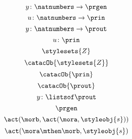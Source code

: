 {\begin{forslides}
\begin{equation}
        \end{equation}
        \begin{equation}
            \label{eq:prgen-y}
            y\colon \natnumbers \to \prgen
        \end{equation}
        \begin{equation}
            \label{eq:prgen-u-1}
            u\colon \natnumbers \to \prin
        \end{equation}
        \begin{equation}
            \label{eq:prgen-y-1}
            y\colon \natnumbers \to \prout
        \end{equation}
        \begin{equation}
            \label{eq:prgen-u-2}
            u\colon \prin
        \end{equation}
        \begin{equation}
            \label{eq:Z}
            \stylesets{Z}
        \end{equation}
        \begin{equation}
            \label{eq:Za}
            \catacOb{\stylesets{Z}}
        \end{equation}
        \begin{equation}
            \label{eq:Ua}
            \catacOb{\prin}
        \end{equation}
        \begin{equation}
            \label{eq:Ya}
            \catacOb{\prout}
        \end{equation}
        \begin{equation}
            \label{eq:prgen-y-2}
            y\colon \listsof  \prout
        \end{equation}
        \begin{equation}
            \label{eq:prgen}
            \prgen
        \end{equation}
        \begin{equation}
            \label{eq:now1}
            \act(\morb, \act(\mora, \styleobj{s}))
        \end{equation}
        \begin{equation}
            \label{eq:now2}
            \act(\mora\mthen\morb, \styleobj{s})
        \end{equation}
        \begin{equation}
            \label{eq:ev-sign}

\end{equation}
\end{forslides}}
